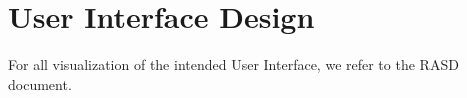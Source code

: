\section{User Interface Design}
For all visualization of the intended User Interface, we refer to the RASD document. 